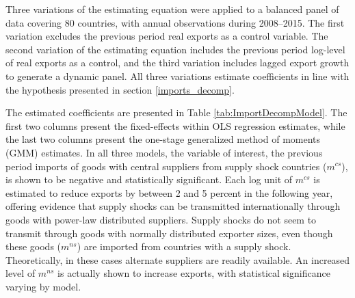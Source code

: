 \documentclass[10pt,letterpaper,pdftex]{article}
\begin{document}
Three variations of the estimating equation were applied to a balanced panel of data covering 80 countries, with annual observations during 2008--2015. The first variation excludes the previous period real exports as a control variable. The second variation of the estimating equation includes the previous period log-level of real exports as a control, and the third variation includes lagged export growth to generate a dynamic panel. All three variations estimate coefficients in line with the hypothesis presented in section \ref{imports_decomp}. 

The estimated coefficients are presented in Table \ref{tab:ImportDecompModel}. The first two columns present the fixed-effects within OLS regression estimates, while the last two columns present the one-stage generalized method of moments (GMM) estimates. In all three models, the variable of interest, the previous period imports of goods with central suppliers from supply shock countries ($m^{cs}$), is shown to be negative and statistically significant. Each log unit of $m^{cs}$ is estimated to reduce exports by between 2 and 5 percent in the following year, offering evidence that supply shocks can be transmitted internationally through goods with power-law distributed suppliers. Supply shocks do not seem to transmit through goods with normally distributed exporter sizes, even though these goods ($m^{ns}$) are imported from countries with a supply shock. Theoretically, in these cases alternate suppliers are readily available. An increased level of $m^{ns}$ is actually shown to increase exports, with statistical significance varying by model. 
\end{document}
